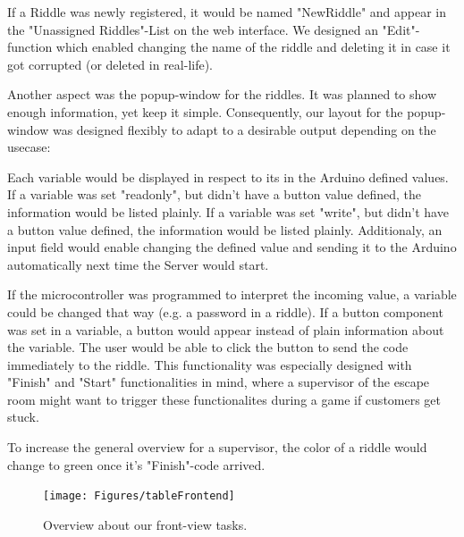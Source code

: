 If a Riddle was newly registered, it would be named "NewRiddle" and appear in the "Unassigned Riddles"-List on the web interface.
We designed an "Edit"-function which enabled changing the name of the riddle and deleting it in case it got corrupted (or deleted in real-life).

Another aspect was the popup-window for the riddles. It was planned to show enough information, yet keep it simple.
Consequently, our layout for the popup-window was designed flexibly to adapt to a desirable output depending on the usecase:

Each variable would be displayed in respect to its in the Arduino defined values.
If a variable was set "readonly", but didn't have a button value defined, the information would be listed plainly.
If a variable was set "write", but didn't have a button value defined, the information would be listed plainly.
Additionaly, an input field would enable changing the defined value and sending it to the Arduino automatically next time the Server would start.

If the microcontroller was programmed to interpret the incoming value, a variable could be changed that way (e.g. a password in a riddle).
If a button component was set in a variable, a button would appear instead of plain information about the variable.
The user would be able to click the button to send the code immediately to the riddle.
This functionality was especially designed with "Finish" and "Start" functionalities in mind, where a supervisor of the escape room might want to trigger these functionalites during a game if customers get stuck.

To increase the general overview for a supervisor, the color of a riddle would change to green once it's "Finish"-code arrived.

\begin{figure}[th]
	\centering
	\texttt{[image: Figures/tableFrontend]}
	\decoRule
	\caption[FrontViewTable]{Overview about our front-view tasks.}
	\label{fig:FrontViewTable}
\end{figure}



